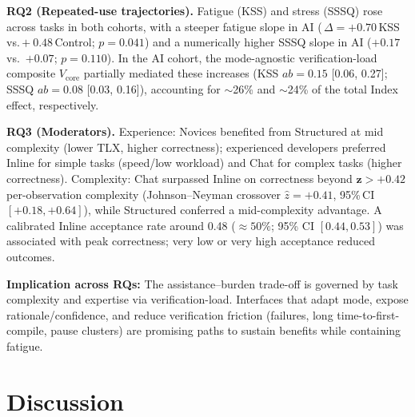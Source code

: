 \documentclass[sigconf]{acmart}
\begin{document}
\textbf{RQ2 (Repeated-use trajectories).} Fatigue (KSS) and stress (SSSQ) rose across tasks in both cohorts, with a steeper fatigue slope in AI (\,$\Delta{=}{+}0.70$\,KSS\,vs.\,$+\ 0.48$\,Control; $p{=}0.041$) and a numerically higher SSSQ slope in AI ($+0.17$ vs.\ $+0.07$; $p{=}0.110$). In the AI cohort, the mode-agnostic verification-load composite $V_{\text{core}}$ partially mediated these increases (KSS $ab{=}0.15$ [0.06, 0.27]; SSSQ $ab{=}0.08$ [0.03, 0.16]), accounting for $\sim$26\% and $\sim$24\% of the total Index effect, respectively.

\textbf{RQ3 (Moderators).} Experience: Novices benefited from Structured at mid complexity (lower TLX, higher correctness); experienced developers preferred Inline for simple tasks (speed/low workload) and Chat for complex tasks (higher correctness). Complexity: Chat surpassed Inline on correctness beyond $\mathbf{z{>}+0.42}$ per-observation complexity (Johnson--Neyman crossover $\hat{z}{=}+0.41$, 95\%\,CI $[+0.18,+0.64]$), while Structured conferred a mid-complexity advantage. A calibrated Inline acceptance rate around 0.48 ($\approx 50\%$; 95\% CI $[0.44, 0.53]$) was associated with peak correctness; very low or very high acceptance reduced outcomes.

\noindent \textbf{Implication across RQs:} The assistance--burden trade-off is governed by task complexity and expertise via verification-load. Interfaces that adapt mode, expose rationale/confidence, and reduce verification friction (failures, long time-to-first-compile, pause clusters) are promising paths to sustain benefits while containing fatigue.


\section{Discussion}
\label{sec:discussion}
\end{document}
